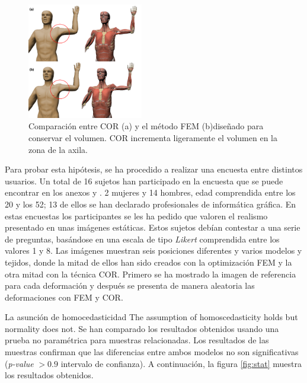  \begin{figure}[h]%
   \centering
   \includegraphics[width=0.45\textwidth]{IMG/AntCOR}
    \caption{ Comparación entre \ac{COR} (a) y el método \ac{FEM} (b)diseñado para conservar el volumen. \ac{COR} incrementa ligeramente el volumen en la zona de la axila.}
    \label{fig:anatomium}
\end{figure}
 
 Para probar esta hipótesis, se ha procedido a realizar una encuesta entre distintos usuarios. Un total de 16 sujetos han participado en la encuesta que se puede encontrar en los anexos \label{anexo:cuestionario1} y \label{anexo:cuestionario2}. 2 mujeres y 14 hombres, edad comprendida entre los 20 y los 52; 13 de ellos se han declarado profesionales de informática gráfica. En estas encuestas los participantes se les ha pedido que valoren el realismo presentado en unas imágenes estáticas. Estos sujetos debían contestar a una serie de preguntas, basándose en una escala de tipo  \emph{Likert} comprendida entre los valores 1 y 8. Las imágenes muestran seis posiciones diferentes y varios modelos y tejidos, donde la mitad de ellos han sido creados con la optimización \ac{FEM} y la otra mitad con la técnica \ac{COR}. Primero se ha mostrado la imagen de referencia para cada deformación y después se presenta de manera aleatoria las deformaciones con \ac{FEM} y \ac{COR}.

 La asunción de homocedasticidad The assumption of homoscedasticity holds but normality does not.  Se han comparado los resultados obtenidos usando una prueba no paramétrica para muestras relacionadas. Los resultados de las muestras confirman que las diferencias entre ambos modelos no son significativas (\emph{p-value} $> 0.9$ intervalo de confianza).   A continuación, la figura \ref{fig:stat} muestra los resultados obtenidos. 
%

